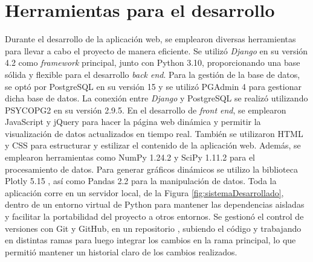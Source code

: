 \section{Herramientas para el desarrollo}
Durante el desarrollo de la aplicación web, se emplearon diversas herramientas para llevar a cabo el proyecto de manera eficiente. Se utilizó \textit{Django} en su versión 4.2 como \textit{framework} principal, junto con Python 3.10, proporcionando una base sólida y flexible para el desarrollo \textit{back end}. Para la gestión de la base de datos, se optó por PostgreSQL en su versión 15 y se utilizó PGAdmin 4 para gestionar dicha base de datos. La conexión entre \textit{Django} y PostgreSQL se realizó utilizando PSYCOPG2 en su versión 2.9.5. En el desarrollo de \textit{front end}, se emplearon JavaScript y jQuery para hacer la página web dinámica y permitir la visualización de datos actualizados en tiempo real. También se utilizaron HTML y CSS para estructurar y estilizar el contenido de la aplicación web. Además, se emplearon herramientas como NumPy 1.24.2 y SciPy 1.11.2 para el procesamiento de datos. Para generar gráficos dinámicos se utilizo la biblioteca Plotly 5.15 , así como Pandas 2.2 para la manipulación de datos. Toda la aplicación corre en un servidor local, de la Figura \ref{fig:sistemaDesarrollado}, dentro de un entorno virtual de Python para mantener las dependencias aisladas y facilitar la portabilidad del proyecto a otros entornos. Se gestionó el control de versiones con Git y GitHub, en un repositorio \cite{AppWebInstrumentalSMN2024}, subiendo el código y trabajando en distintas ramas para luego integrar los cambios en la rama principal, lo que permitió mantener un historial claro de los cambios realizados.
